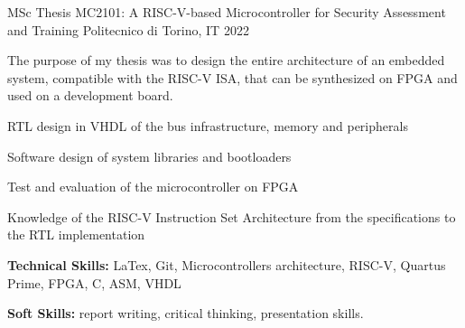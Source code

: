 

\begin{cventries}

  \cventry
    {MSc Thesis} %
    {MC2101: A RISC-V-based Microcontroller for Security Assessment and Training} %
    {Politecnico di Torino, IT} %
    {2022} %
    {
      \begin{cvitems} %
        \item {The purpose of my thesis was to design the entire architecture of an embedded system, compatible with the RISC-V ISA, that can be synthesized on FPGA and used on a development board.}
        \item{RTL design in VHDL of the bus infrastructure, memory and peripherals}
        \item{Software design of system libraries and bootloaders}
        \item{Test and evaluation of the microcontroller on FPGA}
        \item{Knowledge of the RISC-V Instruction Set Architecture from the specifications to the RTL implementation}
        \item {\textbf{Technical Skills:} LaTex, Git, Microcontrollers architecture, RISC-V, Quartus Prime, FPGA, C, ASM, VHDL}
        \item {\textbf{Soft Skills:} report writing, critical thinking, presentation skills.}
      \end{cvitems}
    }



\end{cventries}
